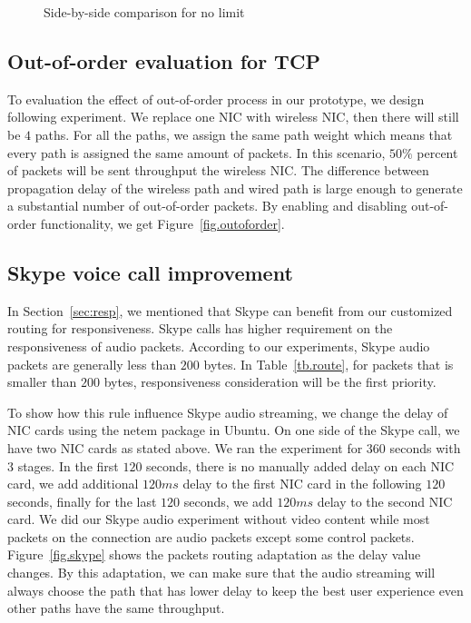 \begin{figure}[htb]
{}
\caption{Side-by-side comparison for no limit}
\label{fig.no_limit}
\end{figure}


\subsection{Out-of-order evaluation for TCP}
\label{sec:reoder}

To evaluation the effect of out-of-order process in our prototype, we design following experiment. We replace one NIC with wireless NIC, then there will still be $4$ paths. For all the paths, we assign the same path weight which means that every path is assigned the same amount of packets. In this scenario, $50\%$ percent of packets will be sent throughput the wireless NIC. The difference between propagation delay of the wireless path and wired path is large enough to generate a substantial number of out-of-order packets. By enabling and disabling out-of-order functionality, we get Figure~\ref{fig.outoforder}.


\subsection{Skype voice call improvement}
\label{sec:skype}

In Section~\ref{sec:resp}, we mentioned that Skype can benefit from our customized routing for responsiveness. Skype calls has higher requirement on the responsiveness of audio packets. According to our experiments, Skype audio packets are generally less than $200$ bytes. In Table~\ref{tb.route}, for packets that is smaller than $200$ bytes, responsiveness consideration will be the first priority. 

To show how this rule influence Skype audio streaming, we change the delay of NIC cards using the netem package in Ubuntu. On one side of the Skype call, we have two NIC cards as stated above. We ran the experiment for $360$ seconds with $3$ stages. In the first $120$ seconds, there is no manually added delay on each NIC card, we add additional $120ms$ delay to the first NIC card in the following $120$ seconds, finally for the last $120$ seconds, we add $120ms$ delay to the second NIC card. We did our Skype audio experiment without video content while most packets on the connection are audio packets except some control packets. Figure~\ref{fig.skype} shows the packets routing adaptation as the delay value changes. By this adaptation, we can make sure that the audio streaming will always choose the path that has lower delay to keep the best user experience even other paths have the same throughput.


